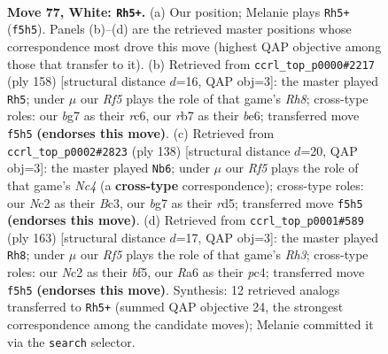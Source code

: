 \documentclass[11pt]{article}
\begin{document}
\clearpage

\begin{figure}[p]\centering
\begin{subfigure}{0.46\textwidth}\centering
\resizebox{\linewidth}{!}{%
\newchessgame
\chessboard[
  setfen={7k/1r4b1/R7/5R2/2P5/8/2N3K1/8 w - - 74 77},
  showmover=false,
  pgfstyle=straightmove, color=movearrow, markmove={f5-h5}
]}
\caption{}
\end{subfigure}\hfill
\begin{subfigure}{0.46\textwidth}\centering
\resizebox{\linewidth}{!}{%
\newchessgame
\chessboard[
  setfen={7R/8/2rkb3/8/8/3K4/8/R7 w - - 17 80},
  showmover=false,
  pgfstyle=straightmove, color=movearrow, markmove={h8-h5}
]}
\caption{}
\end{subfigure}
\\[4pt]
\begin{subfigure}{0.46\textwidth}\centering
\resizebox{\linewidth}{!}{%
\newchessgame
\chessboard[
  setfen={8/8/8/3r1kb1/2N5/2B5/2K5/4R3 w - - 6 70},
  showmover=false,
  pgfstyle=straightmove, color=movearrow, markmove={c4-b6}
]}
\caption{}
\end{subfigure}\hfill
\begin{subfigure}{0.46\textwidth}\centering
\resizebox{\linewidth}{!}{%
\newchessgame
\chessboard[
  setfen={8/2k5/7r/p3KB2/2PB4/1P6/8/8 b - - 2 82},
  showmover=false,
  pgfstyle=straightmove, color=movearrow, markmove={h6-h8}
]}
\caption{}
\end{subfigure}
\caption{\textbf{Move 77, White: \texttt{Rh5+}.} (a) Our position; Melanie plays \texttt{Rh5+} (\texttt{f5h5}). Panels (b)--(d) are the retrieved master positions whose correspondence most drove this move (highest QAP objective among those that transfer to it). (b) Retrieved from \texttt{ccrl\_top\_p0000\#2217} (ply 158) [structural distance $d$=16, QAP obj=3]: the master played \texttt{Rh5}; under $\mu$ our \emph{Rf5} plays the role of that game's \emph{Rh8}; cross-type roles: our \emph{b}g7 as their \emph{r}c6, our \emph{r}b7 as their \emph{b}e6; transferred move \texttt{f5h5} \textbf{(endorses this move)}. (c) Retrieved from \texttt{ccrl\_top\_p0002\#2823} (ply 138) [structural distance $d$=20, QAP obj=3]: the master played \texttt{Nb6}; under $\mu$ our \emph{Rf5} plays the role of that game's \emph{Nc4} (a \textbf{cross-type} correspondence); cross-type roles: our \emph{N}c2 as their \emph{B}c3, our \emph{b}g7 as their \emph{r}d5; transferred move \texttt{f5h5} \textbf{(endorses this move)}. (d) Retrieved from \texttt{ccrl\_top\_p0001\#589} (ply 163) [structural distance $d$=17, QAP obj=3]: the master played \texttt{Rh8}; under $\mu$ our \emph{Rf5} plays the role of that game's \emph{Rh3}; cross-type roles: our \emph{N}c2 as their \emph{b}f5, our \emph{R}a6 as their \emph{p}c4; transferred move \texttt{f5h5} \textbf{(endorses this move)}. Synthesis: 12 retrieved analogs transferred to \texttt{Rh5+} (summed QAP objective 24, the strongest correspondence among the candidate moves); Melanie committed it via the \texttt{search} selector.}
\label{fig:thought-m152}
\end{figure}
\end{document}
